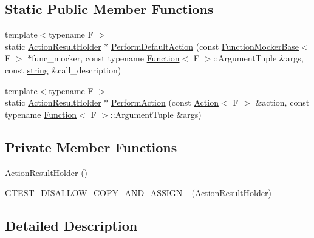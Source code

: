 \subsection*{Static Public Member Functions}
\begin{DoxyCompactItemize}
\item 
{\footnotesize template$<$typename F $>$ }\\static \hyperlink{classtesting_1_1internal_1_1ActionResultHolder}{Action\+Result\+Holder} $\ast$ \hyperlink{classtesting_1_1internal_1_1ActionResultHolder_3_01void_01_4_a140b6ab6a756e60db62e76b01b09a26f}{Perform\+Default\+Action} (const \hyperlink{classtesting_1_1internal_1_1FunctionMockerBase}{Function\+Mocker\+Base}$<$ F $>$ $\ast$func\+\_\+mocker, const typename \hyperlink{structtesting_1_1internal_1_1Function}{Function}$<$ F $>$\+::Argument\+Tuple \&args, const \hyperlink{namespacetesting_1_1internal_a8e8ff5b11e64078831112677156cb111}{string} \&call\+\_\+description)
\item 
{\footnotesize template$<$typename F $>$ }\\static \hyperlink{classtesting_1_1internal_1_1ActionResultHolder}{Action\+Result\+Holder} $\ast$ \hyperlink{classtesting_1_1internal_1_1ActionResultHolder_3_01void_01_4_abb1d387e21341393e0c237ae7b02ee68}{Perform\+Action} (const \hyperlink{classtesting_1_1Action}{Action}$<$ F $>$ \&action, const typename \hyperlink{structtesting_1_1internal_1_1Function}{Function}$<$ F $>$\+::Argument\+Tuple \&args)
\end{DoxyCompactItemize}
\subsection*{Private Member Functions}
\begin{DoxyCompactItemize}
\item 
\hyperlink{classtesting_1_1internal_1_1ActionResultHolder_3_01void_01_4_a4f721cbdde35fde62920fd2495dc55d3}{Action\+Result\+Holder} ()
\item 
\hyperlink{classtesting_1_1internal_1_1ActionResultHolder_3_01void_01_4_afa9b3e5d8c13a7bcecf6b94b891c7383}{G\+T\+E\+S\+T\+\_\+\+D\+I\+S\+A\+L\+L\+O\+W\+\_\+\+C\+O\+P\+Y\+\_\+\+A\+N\+D\+\_\+\+A\+S\+S\+I\+G\+N\+\_\+} (\hyperlink{classtesting_1_1internal_1_1ActionResultHolder}{Action\+Result\+Holder})
\end{DoxyCompactItemize}


\subsection{Detailed Description}
